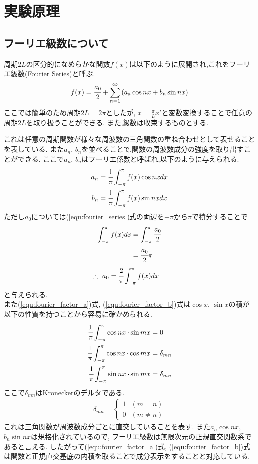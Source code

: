 \section{実験原理}
\subsection{フーリエ級数について}
周期$2L$の区分的になめらかな関数$f(x)$は以下のように展開され,これをフーリエ級数(Fourier Series)と呼ぶ.
\begin{align}
  \label{equ:fourier_series}
  f(x)=\cfrac{a_0}{2}+\sum_{n=1}^{\infty}\left( a_n\cos nx+b_n\sin nx \right)
\end{align}
ここでは簡単のため周期$2L=2\pi$としたが, $x=\tfrac{\pi}{L}x'$と変数変換することで任意の周期$2L$を取り扱うことができる.
また,級数は収束するものとする.

これは任意の周期関数が様々な周波数の三角関数の重ね合わせとして表せることを表している.
また$a_n$, $b_n$を並べることで,関数の周波数成分の強度を取り出すことができる.
ここで$a_n$, $b_n$はフーリエ係数と呼ばれ,以下のように与えられる.
\begin{align}
  \label{equ:fourier_factor_a}
  a_n&=\cfrac{1}{\pi}\int^{\pi}_{-\pi}f(x)\cos nx dx\\
  \label{equ:fourier_factor_b}
  b_n&=\cfrac{1}{\pi}\int^{\pi}_{-\pi}f(x)\sin nx dx
\end{align}
ただし$a_0$については(\ref{equ:fourier_series})式の両辺を$-\pi$から$\pi$で積分することで
\begin{align*}
  \int_{-\pi}^{\pi}f(x)dx&=\int_{-\pi}^{\pi}\cfrac{a_0}{2}\\
  &=\cfrac{a_0}{2}\pi
\end{align*}
\begin{align}
  \label{equ:fourier_factor_0}
  \therefore\ a_0&=\cfrac{2}{\pi}\int^{\pi}_{-\pi}f(x)dx
\end{align}
と与えられる.\\
また(\ref{equ:fourier_factor_a})式, (\ref{equ:fourier_factor_b})式は$\cos x$, $\sin x$の積が以下の性質を持つことから容易に確かめられる.
\begin{align}
  \label{equ:cosinesine}
  \cfrac{1}{\pi}\int^{\pi}_{-\pi}\cos nx\cdot\sin mx &= 0\\
  \cfrac{1}{\pi}\int^{\pi}_{-\pi}\cos nx\cdot\cos mx &= \delta_{mn}\\
  \cfrac{1}{\pi}\int^{\pi}_{-\pi}\sin nx\cdot\sin mx &= \delta_{mn}
\end{align}
ここで$\delta_{mn}$はKroneckerのデルタである.
\begin{align}
  \label{equ:delta}
  \delta_{mn}=
  \begin{cases}
    1 & (m=n)\\
    0 & (m\neq n)
  \end{cases}
\end{align}
これは三角関数が周波数成分ごとに直交していることを表す.
また$a_n\cos nx$, $b_n\sin nx$は規格化されているので,
フーリエ級数は無限次元の正規直交関数系であると言える.
したがって(\ref{equ:fourier_factor_a})式, (\ref{equ:fourier_factor_b})式は関数と正規直交基底の内積を取ることで成分表示をすることと対応している.
